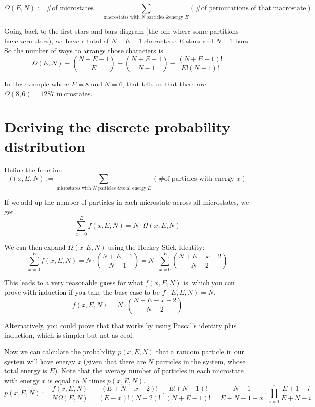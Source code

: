 \documentclass[12pt]{article}
\begin{document}
\[\Omega(E, N) := \text{\# of microstates} = \sum_{\text{macrostates with $N$ particles \& energy $E$}} (\text{\# of permutations of that macrostate})\]

Going back to the first stars-and-bars diagram (the one where some partitions have zero stars), we have a total of $N+E-1$ characters: $E$ stars and $N-1$ bars. So the number of ways to arrange those characters is
\[\Omega(E, N) = {{N+E-1} \choose E} = {{N+E-1} \choose {N-1}} = \frac{(N+E-1)!}{E!(N-1)!} \]

In the example where $E=8$ and $N=6$, that tells us that there are $\Omega(8, 6) = 1287$ microstates.

\section{Deriving the discrete probability distribution}

Define the function
\[f(x, E, N) := \sum_{\text{microstates with $N$ particles \& total energy $E$}} (\text{\# of particles with energy $x$})\]

If we add up the number of particles in each microstate across all microstates, we get
\[\sum_{x=0}^E f(x, E, N) = N \cdot \Omega(x, E, N)\]

We can then expand $\Omega(x, E, N)$ using the Hockey Stick Identity:
\[\sum_{x=0}^E f(x, E, N) = N \cdot {{N+E-1} \choose {N-1}} = N \cdot \sum_{x=0}^E {{N+E-x-2} \choose {N-2}} \]

This leads to a very reasonable guess for what $f(x, E, N)$ is, which you can prove with induction if you take the base case to be $f(E,E,N) = N$.
\[f(x, E, N) = N \cdot {{N+E-x-2} \choose {N-2}}\]

Alternatively, you could prove that that works by using Pascal's identity plus induction, which is simpler but not as cool.

Now we can calculate the probability $p(x, E, N)$ that a random particle in our system will have energy $x$ (given that there are $N$ particles in the system, whose total energy is $E$). Note that the average number of particles in each microstate with energy $x$ is equal to $N$ times $p(x, E, N)$.
\[p(x, E, N) := \frac{f(x, E, N)}{N \Omega(E, N)} = \frac{(E+N-x-2)!}{(E-x)!(N-2)!} \cdot \frac{E!(N-1)!}{(N+E-1)!} = \frac{N-1}{E+N-1-x} \cdot \prod_{i=1}^x \frac{E+1-i}{E+N-i} \]
\end{document}
